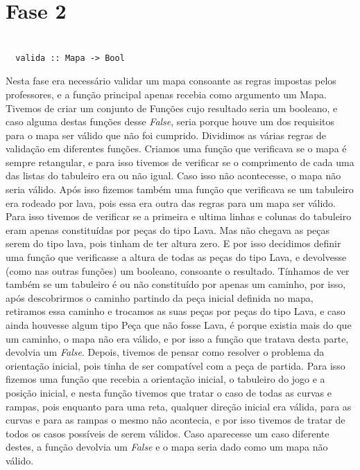 \documentclass[a4paper]{report} %
\begin{document}
\section{Fase 2}

    \begin{verbatim}

  valida :: Mapa -> Bool

\end{verbatim}
    
    Nesta fase era necessário validar um mapa consoante as regras impostas pelos professores, e a função principal apenas recebia como argumento um Mapa. 
    Tivemos de criar um conjunto de Funções cujo resultado seria um booleano, e caso alguma destas funções desse \textit{False}, seria porque houve um dos requisitos para o mapa ser válido que não foi cumprido.
    Dividimos as várias regras de validação em diferentes funções. 
    Criamos uma função que verificava se o mapa é sempre retangular, e para isso tivemos de verificar se o comprimento de cada uma das listas do tabuleiro era ou não igual. Caso isso não acontecesse, o mapa não seria válido. Após isso fizemos também uma função que verificava se um tabuleiro era rodeado por lava, pois essa era outra das regras para um mapa ser válido. Para isso tivemos de verificar se a primeira e ultima linhas e colunas do tabuleiro eram apenas constituídas por peças do tipo Lava.
    Mas não chegava as peças serem do tipo lava, pois tinham de ter altura zero. E por isso decidimos definir uma função que verificasse a altura de todas as peças do tipo Lava, e devolvesse (como nas outras funções) um booleano, consoante o resultado.
    Tínhamos de ver também se um tabuleiro é ou não constituído por apenas um caminho, por isso, após descobrirmos o caminho partindo da peça inicial definida no mapa, retiramos essa caminho e trocamos as suas peças por peças do tipo Lava, e caso ainda houvesse algum tipo Peça que não fosse Lava, é porque existia mais do que um caminho, o mapa não era válido, e por isso a função que tratava desta parte, devolvia um \textit{False}. 
    Depois, tivemos de pensar como resolver o problema da orientação inicial, pois tinha de ser compatível com a peça de partida.  Para isso fizemos uma função que recebia a orientação inicial, o tabuleiro do jogo e a posição inicial, e nesta função tivemos que tratar o caso de todas as curvas e rampas, pois enquanto para uma reta, qualquer direção inicial era válida, para as curvas e para as rampas o mesmo não acontecia, e por isso tivemos de tratar de todos os casos possíveis de serem válidos. Caso aparecesse um caso diferente destes, a função devolvia um \textit{False} e o mapa seria dado como um mapa não válido.
\end{document}

